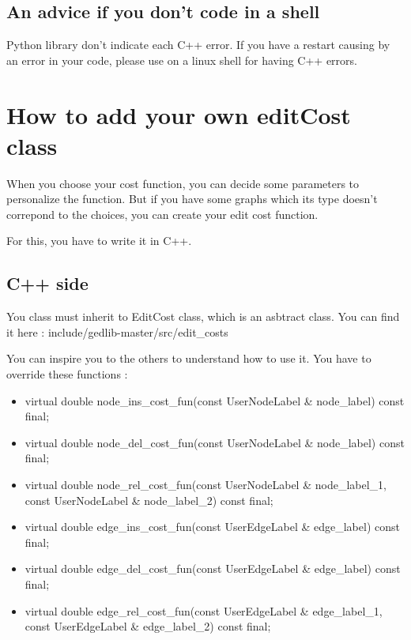 \documentclass[letterpaper,10pt,english]{sphinxmanual}
\begin{document}
\section{An advice if you don't code in a shell}
\label{readme:an-advice-if-you-don-t-code-in-a-shell}
Python library don't indicate each C++ error. If you have a restart causing by an error in your code, please use on a linux shell for having C++ errors.


\chapter{How to add your own editCost class}
\label{editcost:how-to-add-your-own-editcost-class}\label{editcost::doc}
When you choose your cost function, you can decide some parameters to personalize the function. But if you have some graphs which its type doesn't correpond to the choices, you can create your edit cost function.

For this, you have to write it in C++.


\section{C++ side}
\label{editcost:c-side}
You class must inherit to EditCost class, which is an asbtract class. You can find it here : include/gedlib-master/src/edit\_costs

You can inspire you to the others to understand how to use it. You have to override these functions :
\begin{itemize}
\item {} 
virtual double node\_ins\_cost\_fun(const UserNodeLabel \& node\_label) const final;

\item {} 
virtual double node\_del\_cost\_fun(const UserNodeLabel \& node\_label) const final;

\item {} 
virtual double node\_rel\_cost\_fun(const UserNodeLabel \& node\_label\_1, const UserNodeLabel \& node\_label\_2) const final;

\item {} 
virtual double edge\_ins\_cost\_fun(const UserEdgeLabel \& edge\_label) const final;

\item {} 
virtual double edge\_del\_cost\_fun(const UserEdgeLabel \& edge\_label) const final;

\item {} 
virtual double edge\_rel\_cost\_fun(const UserEdgeLabel \& edge\_label\_1, const UserEdgeLabel \& edge\_label\_2) const final;

\end{itemize}
\end{document}
